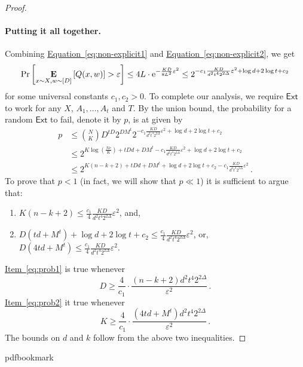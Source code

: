 \documentclass[11pt]{article}
\numberwithin{equation}{section}
\theoremstyle{definition}
\theoremstyle{plain}
\newcommand{\eee}{\mathrm e}
\newcommand{\expeqref}[2]{\hyperref[#2]{#1~\eqref{#2}}}
\newcommand{\ext}{\mathsf{Ext}}
\newcommand{\adv}{A}
\newcommand{\eps}{\varepsilon}
\newcommand{\E}{\mathop{\bf E\/}}
\begin{document}
\begin{proof}
\paragraph*{Putting it all together.}   %
Combining \expeqref{Equation}{eq:non-explicit1} and \expeqref{Equation}{eq:non-explicit2}, we get
\[
\Pr\left[\E_{x \sim X,w \sim [D]}\left[ Q(x,w) \right] > \eps\right] \le 4L \cdot
\eee^{-\frac{KD}{8L^2}\eps^2}
\le 2^{-c_{1}\frac{KD}{d^{2}t^{4}2^{2\Delta}}\eps^{2}+\log d + 2\log t + c_2}
\]
for some universal constants $c_1,c_2 > 0$. To complete our analysis, we require $\ext$
to work for any $X$, $\adv_1,\ldots,\adv_t$ and $T$. By the union bound, the probability
for a random $\ext$ to fail, denote it by $p$, is at given by
\begin{align*}
p &\le \binom{N}{K}D^{tD}2^{DM^t}2^{-c_{1}\frac{KD}{d^{2}t^{4}2^{2\Delta}}\eps^{2}+\log d + 2\log t + c_2} \\
&\le 2^{K\log\left( \frac{Ne}{K} \right) + tDd + DM^t - c_{1}\frac{KD}{d^{2}t^{4}2^{2\Delta}}\eps^{2}+\log d + 2\log t + c_2} \\
&\le 2^{K(n-k+2)+tDd+DM^t +\log d +2\log t + c_2 - c_{1}\frac{KD}{d^{2}t^{4}2^{2\Delta}}\eps^{2}}\,.
\end{align*}
To prove that $p < 1$ (in fact, we will show that $p \ll 1$) it is sufficient to argue that:
\begin{enumerate}
\item\label{eq:prob1}  $K(n-k+2) \le \frac{c_1}{4}\frac{KD}{d^{2}t^{4}2^{2\Delta}}\eps^{2}$, and,
\item\label{eq:prob2}  $D(td+M^t) +\log d +2\log t + c_2  \le \frac{c_1}{4}\frac{KD}{d^{2}t^{4}2^{2\Delta}}\eps^{2}$, or, $D(4td+M^t) \le \frac{c_1}{4}\frac{KD}{d^{2}t^{4}2^{2\Delta}}\eps^{2}$.
\end{enumerate}
\expeqref{Item}{eq:prob1} is true whenever 
\[
D \ge \frac{4}{c_1} \cdot \frac{(n-k+2)d^{2}t^{4}2^{2\Delta}}{\eps^2}\,.
\]
\expeqref{Item}{eq:prob2} it true whenever
\[
K \ge \frac{4}{c_1} \cdot \frac{(4td+M^t)d^{2}t^{4}2^{2\Delta}}{\eps^2}\,.
\]
The bounds on $d$ and $k$ follow from the above two inequalities.
\end{proof}






\newcommand{\prelim}{Preliminary version in\ }\newcommand{\prelims}{Preliminary
  versions in\ }
\providecommand{\bibhead}[1]{}
\expandafter\ifx\csname pdfbookmark\endcsname\relax%
  \providecommand{\tocrefpdfbookmark}{}
\else\providecommand{\tocrefpdfbookmark}{%
   \hypertarget{tocreferences}{}%
   \pdfbookmark[1]{References}{tocreferences}}%
\fi
\end{document}
